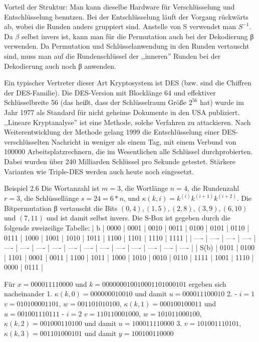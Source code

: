 \documentclass[a4paper]{article}
\begin{document}
\begin{multicols}{3}
Vorteil der Struktur: Man kann dieselbe Hardware für Verschlüsselung und Entschlüsselung benutzen. Bei der Entschlüsselung läuft der Vorgang rückwärts ab, wobei die Runden anders gruppiert sind. Anstelle von S verwendet man $S^{-1}$. Da $β$ selbst invers ist, kann man für die Permutation auch bei der Dekodierung β verwenden. Da Permutation und Schlüsselanwendung in den Runden vertauscht sind, muss man auf die Rundenschlüssel der ,,inneren'' Runden bei der Dekodierung auch noch β anwenden.

Ein typischer Vertreter dieser Art Kryptosystem ist DES (bzw. sind die Chiffren der DES-Familie). Die DES-Version mit Blocklänge 64 und effektiver Schlüsselbreite 56 (das heißt, dass der Schlüsselraum Größe $2^{56}$ hat) wurde im Jahr 1977 als Standard für nicht geheime Dokumente in den USA publiziert. ,,Lineare Kryptanalyse'' ist eine Methode, solche Verfahren zu attackieren. Nach Weiterentwicklung der Methode gelang 1999 die Entschlüsselung einer DES-verschlüsselten Nachricht in weniger als einem Tag, mit einem Verbund von 100000 Arbeitsplatzrechnern, die im Wesentlichen alle Schlüssel durchprobierten. Dabei wurden über 240 Milliarden Schlüssel pro Sekunde getestet. Stärkere Varianten wie Triple-DES werden auch heute noch eingesetzt.

Beispiel 2.6 Die Wortanzahl ist $m=3$, die Wortlänge $n=4$, die Rundenzahl $r=3$, die Schlüssellänge $s=24=6*n$, und $\kappa (k,i)=k^{(i)}k^{(i+1)}k^{(i+2)}$. Die Bitpermutation β vertauscht die Bits $(0,4),(1,5),(2,8),(3,9),(6,10)$ und $(7,11)$ und ist damit selbst invers. Die S-Box ist gegeben durch die folgende zweizeilige Tabelle:
| b    | 0000 | 0001 | 0010 | 0011 | 0100 | 0101 | 0110 | 0111 | 1000 | 1001 | 1010 | 1011 | 1100 | 1101 | 1110 | 1111 |
| ---- | ---- | ---- | ---- | ---- | ---- | ---- | ---- | ---- | ---- | ---- | ---- | ---- | ---- | ---- | ---- |
| S(b) | 0101 | 0100 | 1101 | 0001 | 0011 | 1100 | 1011 | 1000 | 1010 | 0010 | 0110 | 1111 | 1001 | 1110 | 0000 | 0111 |

Für $x= 0000 1111 0000$ und $k=0000 0001 0010 0011 0100 0101$ ergeben sich nacheinander
1. $\kappa (k,0) = 0000 0001 0010$ und damit $u= 0000 1110 0010$
2. 
   - $i=1$ $v=0101 0000 1101$, $w=0011 0101 0100$, $\kappa (k,1) = 0001 0010 0011$ und $u=0010 0111 0111$ 
   - $i=2$ $v=1101 1000 1000$, $w=1010 1100 0100$, $\kappa (k,2) = 0010 0011 0100$ und damit $u= 1000 1111 0000$
3. $v=1010 0111 0101$, $\kappa (k,3) = 0011 0100 0101$ und damit $y=1001 0011 0000$



\end{multicols}
\end{document}
